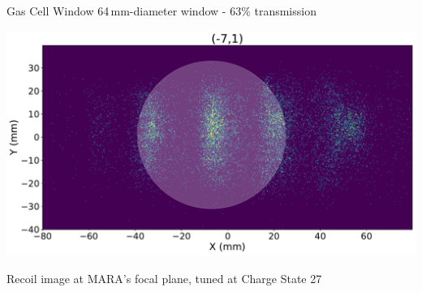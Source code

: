 \documentclass{beamer}
\begin{document}
\begin{frame}{Gas Cell Window}
    \centering
    \vspace*{3em}
    64\,mm-diameter window - 63\% transmission  

    \includegraphics[width=\textwidth]{Window3states.pdf} 
    
    Recoil image at MARA's focal plane, tuned at Charge State 27
\end{frame}
\end{document}
